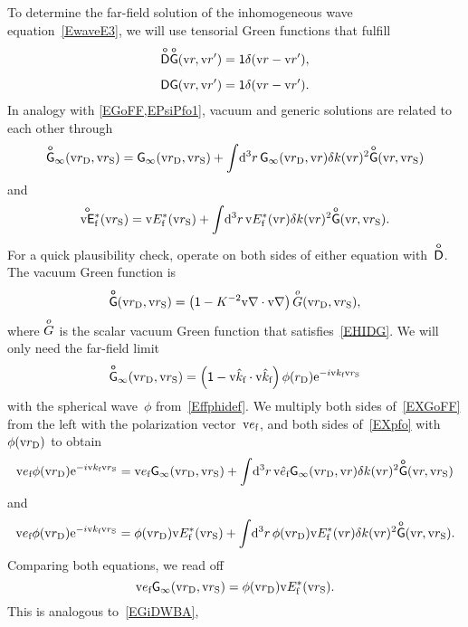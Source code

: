To determine the far-field solution of the inhomogeneous wave equation~\cref{EwaveE3},
we will use tensorial Green functions that fulfill
%
\begin{align}
    \TDo\TGo(\r,\r') &= \ONE\delta(\r-\r'), \\[1.2ex]
    \TD  \TG  (\r,\r') &= \ONE\delta(\r-\r').
\end{align}
In analogy with \cref{EGoFF,EPsiPfo1},
vacuum and generic solutions are related to each other through
\begin{equation}\label{EXGoFF}
  \TGo_\infty(\rD,\rS)
  = \TG_\infty(\rD,\rS) + \int\!\d^3r\, \TG_\infty(\rD,\r)\delta k(\r)^2 \TGo(\r,\rS)
\end{equation}
and
\begin{equation}\label{EXpfo}
  \Efoc(\rS) = \Efc(\rS) + \int\!\d^3r\, \Efc(\r)\delta k(\r)^2 \TGo(\r,\rS).
\end{equation}
For a quick plausibility check, operate on both sides of either equation with~$\TDo$.
The vacuum Green function is
\begin{equation}\label{EXGoIE}
  \TGo(\rD,\rS) = \left( \ONE - K^{-2}\Nabla\cdot\Nabla \right) \Go(\rD,\rS),
\end{equation}
where $\Go$ is the scalar vacuum Green function that satisfies~\cref{EHIDG}.
We will only need the far-field limit
\begin{equation}\label{EXGoff}
  \TGo_\infty(\rD,\rS)
   = \left( \ONE - \v{\hat k}_\sf\cdot\v{\hat k}_\sf \right) \phi(r_\text{D})\e^{-i\k_\sf\rS}
\end{equation}
with the spherical wave~$\phi$ from~\cref{Effphidef}.
We multiply both sides of~\cref{EXGoFF} from the left with the polarization vector~$\v{e}_\sf$,
and both sides of~\cref{EXpfo} with~$\phi(\rD)$ to obtain
\begin{equation}\label{EXGoFF2}
  \v{e}_\sf\phi(\rD)\e^{-i\k_\sf\rS}
  = \v{e}_\sf\TG_\infty(\rD,\rS) + \int\!\d^3r\, \hef\TG_\infty(\rD,\r)\delta k(\r)^2 \TGo(\r,\rS)
\end{equation}
and
\begin{equation}\label{EXpfo2}
  \v{e}_\sf\phi(\rD)\e^{-i\k_\sf\rS}
  = \phi(\rD)\Efc(\rS) + \int\!\d^3r\, \phi(\rD)\Efc(\r)\delta k(\r)^2 \TGo(\r,\rS).
\end{equation}
Comparing both equations, we read off
\begin{equation}\label{EGpE}
  \v{e}_\sf\TG_\infty(\rD,\rS) = \phi(\rD)\Efc(\rS).
\end{equation}
This is analogous to~\cref{EGiDWBA},

